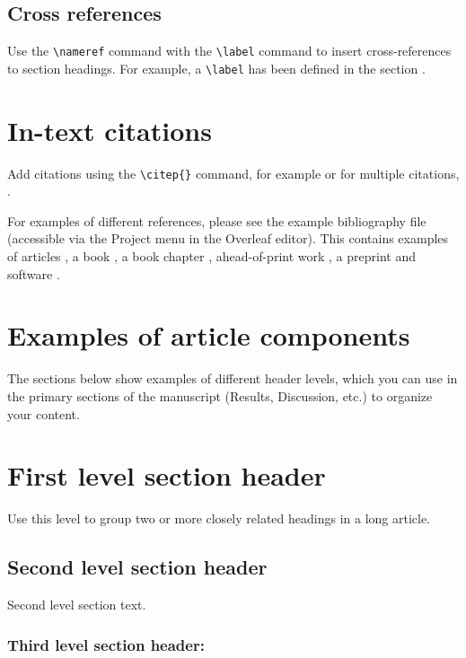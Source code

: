 \documentclass[9pt,twocolumn,twoside,lineno]{gsag3jnl}
\begin{document}
\subsection{Cross references}
Use the \verb|\nameref| command with the \verb|\label| command to insert cross-references to section headings. For example, a \verb|\label| has been defined in the section .

\section{In-text citations}

Add citations using the \verb|\citep{}| command, for example \citep{neher2013genealogies} or for multiple citations, \citep{neher2013genealogies, rodelsperger2014characterization}.

For examples of different references, please see the example bibliography file (accessible via the Project menu in the Overleaf editor). This contains examples of articles \citep{neher2013genealogies, rodelsperger2014characterization}, a book \citep{Sturtevent2001}, a book chapter \citep{Sturtevent2001chp7}, ahead-of-print work \citep{Starita2015}, a preprint \citep{Falush16} and software \citep{Kruijer2015}.

\section{Examples of article components}
\label{sec:examples}

The sections below show examples of different header levels, which you can use in the primary sections of the manuscript (Results, Discussion, etc.) to organize your content.

\section{First level section header}

Use this level to group two or more closely related headings in a long article.

\subsection{Second level section header}

Second level section text.

\subsubsection{Third level section header:}
\end{document}
